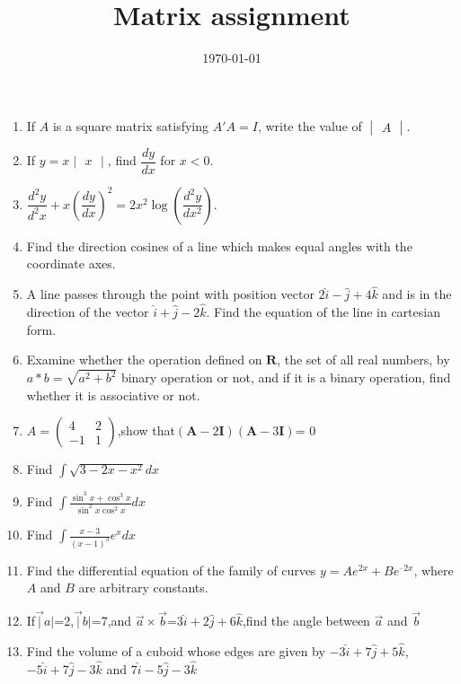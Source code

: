 \documentclass[12pt,-letter paper]{article}
\title{Matrix assignment}
\date{\today}
\providecommand{\brak}[1]{\ensuremath{\left(#1\right)}}
\theoremstyle{remark}
\newcommand{\myvec}[1]{\ensuremath{\begin{pmatrix}#1\end{pmatrix}}}
\newcommand{\mydet}[1]{\ensuremath{\begin{vmatrix}#1\end{vmatrix}}}
\let\vec\mathbf
\begin{document}
\begin{enumerate}
\item If $A$ is a square matrix satisfying $A'A = I$, write the value of $\mydet{A}$.
   
\item If $y=x\mydet{x}$, find $\dfrac{dy}{dx}$ for $x < 0$.
        
 \item $\dfrac{d^2y}{d^2x}+x\brak{\dfrac{dy}{dx}}^2=2x^2\log\brak{\dfrac{d^2y}{dx^2}}$.
 
 \item Find the direction cosines of a line which makes equal angles with the coordinate axes.
 
 \item A line passes through the point with position vector $2\hat{i}-\hat{j}+4\hat{k}$ and is in the direction of the vector $\hat{i}+\hat{j}-2\hat{k}$. Find the equation of the line in cartesian form.
 
 \item Examine whether the operation defined on $\textbf{R}$, the set of all real numbers, by $a *b = \sqrt{a^2+b^2}$ binary operation or not, and if it is a binary operation, find whether it is associative or not.
 
\item $A= \myvec{4&2\\-1& 1}$,show that\brak{\vec{A}-2\vec{I}}\brak{\vec{A}-3\vec{I}}= $0$

\item Find $\int\sqrt{3-2x-x^2}dx$

\item Find $\int{\frac{\sin^3{x}+\cos^3{x}}{\sin^2{x}\cos^2{x}}}dx$

\item Find $\int{\frac{x-3}{\brak{x-1}^3}}e^x dx$

\item Find the differential equation of the family of curves ${y} = Ae^{2x} + Be^{–2x}$, where $A$ and $B$ are arbitrary constants.

\item If$\overrightarrow|{a}|$=2,$\overrightarrow|{b}|$=7,and $\overrightarrow{a}\times \overrightarrow{b}$=$3\hat{i}+2\hat{j}+6\hat{k}$,find the angle between $\overrightarrow{a}$ and $\overrightarrow{b}$

\item Find the volume of a cuboid whose edges are given by $-3\hat{i}+7\hat{j}+5\hat{k}$,$-5\hat{i}+7\hat{j}-3\hat{k}$ and $7\hat{i}-5\hat{j}-3\hat{k}$


\end{enumerate}
\end{document}
